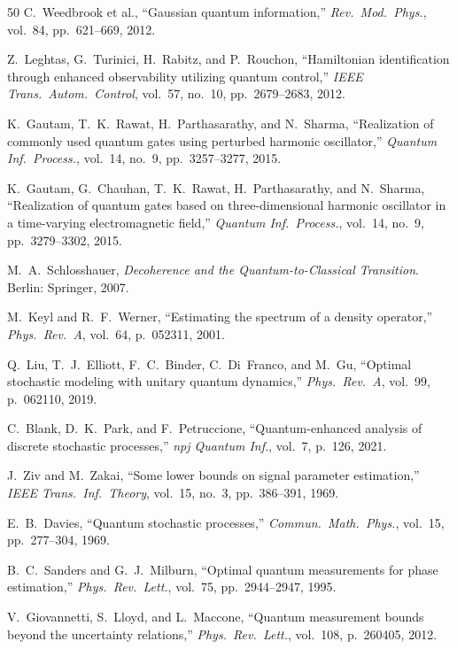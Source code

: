 \documentclass[journal,twocolumn]{IEEEtran}
\theoremstyle{definition}
\theoremstyle{plain}
\begin{document}
\begin{thebibliography}{50}
C.~Weedbrook et al., ``Gaussian quantum information,''
\emph{Rev.\ Mod.\ Phys.}, vol.~84, pp.~621--669, 2012.

Z.~Leghtas, G.~Turinici, H.~Rabitz, and P.~Rouchon,
``Hamiltonian identification through enhanced observability utilizing
quantum control,'' \emph{IEEE Trans.\ Autom.\ Control},
vol.~57, no.~10, pp.~2679--2683, 2012.

K.~Gautam, T.~K.~Rawat, H.~Parthasarathy, and N.~Sharma,
``Realization of commonly used quantum gates using perturbed harmonic
oscillator,'' \emph{Quantum Inf.\ Process.}, vol.~14, no.~9,
pp.~3257--3277, 2015.

K.~Gautam, G.~Chauhan, T.~K.~Rawat, H.~Parthasarathy, and
N.~Sharma, ``Realization of quantum gates based on three-dimensional
harmonic oscillator in a time-varying electromagnetic field,''
\emph{Quantum Inf.\ Process.}, vol.~14, no.~9, pp.~3279--3302, 2015.

M.~A.~Schlosshauer, \emph{Decoherence and the Quantum-to-Classical
Transition}. Berlin: Springer, 2007.

M.~Keyl and R.~F.~Werner, ``Estimating the spectrum of a density
operator,'' \emph{Phys.\ Rev.\ A}, vol.~64, p.~052311, 2001.

Q.~Liu, T.~J.~Elliott, F.~C.~Binder, C.~Di~Franco, and M.~Gu,
``Optimal stochastic modeling with unitary quantum dynamics,''
\emph{Phys.\ Rev.\ A}, vol.~99, p.~062110, 2019.

C.~Blank, D.~K.~Park, and F.~Petruccione,
``Quantum-enhanced analysis of discrete stochastic processes,''
\emph{npj Quantum Inf.}, vol.~7, p.~126, 2021.

J.~Ziv and M.~Zakai, ``Some lower bounds on signal parameter
estimation,'' \emph{IEEE Trans.\ Inf.\ Theory}, vol.~15, no.~3,
pp.~386--391, 1969.

E.~B.~Davies, ``Quantum stochastic processes,''
\emph{Commun.\ Math.\ Phys.}, vol.~15, pp.~277--304, 1969.

B.~C.~Sanders and G.~J.~Milburn, ``Optimal quantum measurements for
phase estimation,'' \emph{Phys.\ Rev.\ Lett.}, vol.~75,
pp.~2944--2947, 1995.

V.~Giovannetti, S.~Lloyd, and L.~Maccone,
``Quantum measurement bounds beyond the uncertainty relations,''
\emph{Phys.\ Rev.\ Lett.}, vol.~108, p.~260405, 2012.


\end{thebibliography}
\end{document}
